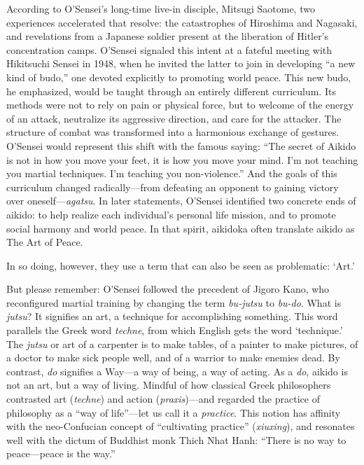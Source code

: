 According to O'Sensei's long-time live-in disciple, Mitsugi Saotome, two experiences accelerated that resolve: the catastrophes of Hiroshima and Nagasaki, and revelations from a Japanese soldier present at the liberation of Hitler's concentration camps. O'Sensei signaled this intent at a fateful meeting with Hikitsuchi Sensei in 1948, when he invited the latter to join in developing ``a new kind of budo,'' one devoted explicitly to promoting world peace. This new budo, he emphasized, would be taught through an entirely different curriculum. Its methods were not to rely on pain or physical force, but to welcome of the energy of an attack, neutralize its aggressive direction, and care for the attacker. The structure of combat was transformed into a harmonious exchange of gestures. O'Sensei would represent this shift with the famous saying: ``The secret of Aikido is not in how you move your feet, it is how you move your mind. I'm not teaching you martial techniques. I'm teaching you non-violence.'' And the goals of this curriculum changed radically---from defeating an opponent to gaining victory over oneself---\emph{agatsu}. In later statements, O'Sensei identified two concrete ends of aikido: to help realize each individual's personal life mission, and to promote social harmony and world peace. In that spirit, aikidoka often translate aikido as The Art of Peace. 

In so doing, however, they use a term that can also be seen as problematic: `Art.' 

But please remember: O'Sensei followed the precedent of Jigoro Kano, who reconfigured martial training by changing the term \emph{bu-jutsu} to \emph{bu-do}. What is \emph{jutsu}? It signifies an art, a technique for accomplishing something. This word parallels the Greek word \emph{techne}, from which English gets the word `technique.' The \emph{jutsu} or art of a carpenter is to make tables, of a painter to make pictures, of a doctor to make sick people well, and of a warrior to make enemies dead. By contrast, \emph{do} signifies a Way---a way of being, a way of acting. As a \emph{do}, aikido is not an art, but a way of living. Mindful of how classical Greek philosophers contrasted art (\emph{techne}) and action (\emph{praxis})---and regarded the practice of philosophy as a ``way of life''---let us call it a \emph{practice}. This notion has affinity with the neo-Confucian concept of ``cultivating practice'' (\emph{xiuxing}), and resonates well with the dictum of Buddhist monk Thich Nhat Hanh: ``There is no way to peace---peace is the way.''

